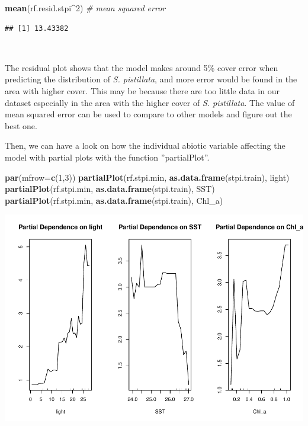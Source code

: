 \documentclass[
]{article}
\newenvironment{Shaded}{\begin{snugshade}}{\end{snugshade}}
\newcommand{\CommentTok}[1]{\textcolor[rgb]{0.56,0.35,0.01}{\textit{#1}}}
\newcommand{\DataTypeTok}[1]{\textcolor[rgb]{0.13,0.29,0.53}{#1}}
\newcommand{\DecValTok}[1]{\textcolor[rgb]{0.00,0.00,0.81}{#1}}
\newcommand{\KeywordTok}[1]{\textcolor[rgb]{0.13,0.29,0.53}{\textbf{#1}}}
\newcommand{\NormalTok}[1]{#1}
\newcommand{\OperatorTok}[1]{\textcolor[rgb]{0.81,0.36,0.00}{\textbf{#1}}}
\begin{document}
\begin{Shaded}
\begin{Highlighting}[]
\KeywordTok{mean}\NormalTok{(rf.resid.stpi}\OperatorTok{^}\DecValTok{2}\NormalTok{) }\CommentTok{# mean squared error}
\end{Highlighting}
\end{Shaded}

\begin{verbatim}
## [1] 13.43382
\end{verbatim}

~

The residual plot shows that the model makes around 5\% cover error when
predicting the distribution of \emph{S. pistillata}, and more error
would be found in the area with higher cover. This may be because there
are too little data in our dataset especially in the area with the
higher cover of \emph{S. pistillata}. The value of mean squared error
can be used to compare to other models and figure out the best one.

Then, we can have a look on how the individual abiotic variable
affecting the model with partial plots with the function
''partialPlot''.

\begin{Shaded}
\begin{Highlighting}[]
\KeywordTok{par}\NormalTok{(}\DataTypeTok{mfrow=}\KeywordTok{c}\NormalTok{(}\DecValTok{1}\NormalTok{,}\DecValTok{3}\NormalTok{)) }
\KeywordTok{partialPlot}\NormalTok{(rf.stpi.min, }\KeywordTok{as.data.frame}\NormalTok{(stpi.train), light)}
\KeywordTok{partialPlot}\NormalTok{(rf.stpi.min, }\KeywordTok{as.data.frame}\NormalTok{(stpi.train), SST)}
\KeywordTok{partialPlot}\NormalTok{(rf.stpi.min, }\KeywordTok{as.data.frame}\NormalTok{(stpi.train), Chl_a)}
\end{Highlighting}
\end{Shaded}

\includegraphics{index_files/figure-latex/unnamed-chunk-12-1.pdf}
\end{document}
